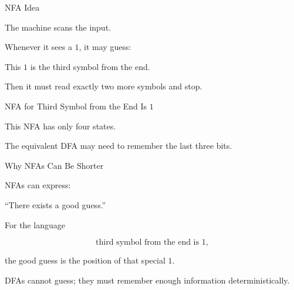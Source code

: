 \documentclass[10pt,aspectratio=169]{beamer}
\begin{document}
\begin{frame}{NFA Idea}

The machine scans the input.

Whenever it sees a \(1\), it may guess:

\begin{center}
This \(1\) is the third symbol from the end.
\end{center}

Then it must read exactly two more symbols and stop.

\end{frame}

\begin{frame}{NFA for Third Symbol from the End Is \(1\)}

\begin{center}
\end{center}

\vspace{0.5em}

This NFA has only four states.

\pause

The equivalent DFA may need to remember the last three bits.

\end{frame}

\begin{frame}{Why NFAs Can Be Shorter}

NFAs can express:

\begin{center}
``There exists a good guess.''
\end{center}

\vspace{1em}

For the language

\[
\text{third symbol from the end is }1,
\]

the good guess is the position of that special \(1\).

\vspace{1em}

DFAs cannot guess; they must remember enough information deterministically.

\end{frame}
\end{document}
